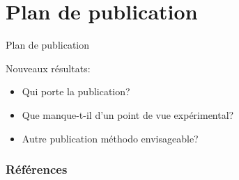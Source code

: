 \documentclass[10pt]{beamer}
\begin{document}
\section{Plan de publication}

\begin{frame}{Plan de publication}

  Nouveaux résultats:
  \begin{itemize}
  \item<2-> Qui porte la publication?
  \item<3-> Que manque-t-il d'un point de vue expérimental?
  \item<4-> Autre publication méthodo envisageable? 
  \end{itemize}


\end{frame}


\nocite{*}

\appendix
{}


\begin{frame}[allowframebreaks]
  \frametitle{Références}
  
  \scriptsize{
    
  }
\end{frame}
\end{document}
